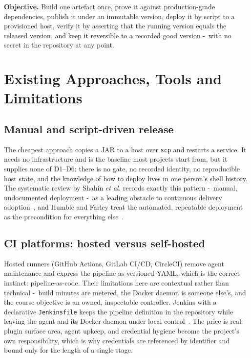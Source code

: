 \documentclass[10pt,a4paper]{article}
\begin{document}
\noindent\textbf{Objective.} Build one artefact once, prove it against production-grade
dependencies, publish it under an immutable version, deploy it by script to a provisioned host,
verify it by asserting that the running version equals the released version, and keep it
reversible to a recorded good version -\ with no secret in the repository at any point.

\newpage

\section{Existing Approaches, Tools and Limitations}

\subsection{Manual and script-driven release}
The cheapest approach copies a JAR to a host over \texttt{scp} and restarts a service. It needs
no infrastructure and is the baseline most projects start from, but it supplies none of D1--D6:
there is no gate, no recorded identity, no reproducible host state, and the knowledge of how to
deploy lives in one person's shell history. The systematic review by Shahin \textit{et al.}
records exactly this pattern -\ manual, undocumented deployment -\ as a
leading obstacle to continuous delivery adoption~\cite{shahin2017,chen2015}, and Humble and
Farley treat the automated, repeatable deployment as the precondition for everything
else~\cite{humble2010}.

\subsection{CI platforms: hosted versus self-hosted}
Hosted runners (GitHub Actions, GitLab CI/CD, CircleCI) remove agent maintenance and express the
pipeline as versioned YAML, which is the correct instinct: pipeline-as-code. Their limitations
here are contextual rather than technical -\ build minutes are metered, the Docker
daemon is someone else's, and the course objective is an owned, inspectable controller.
Jenkins with a declarative \texttt{Jenkinsfile} keeps the pipeline definition in the repository
while leaving the agent and its Docker daemon under local control~\cite{jenkins}. The price is
real: plugin surface area, agent upkeep, and credential hygiene become the project's own
responsibility, which is why credentials are referenced by identifier and bound only for the
length of a single stage.
\end{document}
